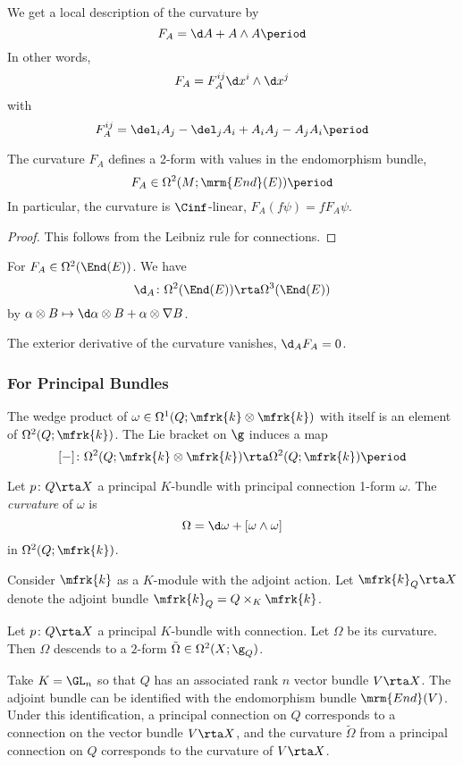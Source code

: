 We get a local description of the curvature by 
	\[
		F_A=\d A+A\wedge A\period 
	\]
	In other words, 
	\[
		F_A=F_A^{ij}\d x^i\wedge \d x^j
	\]
	with
	\[
		F^{ij}_A=\del_iA_j-\del_jA_i+A_iA_j-A_jA_i \period
	\]

\begin{claim}
The curvature $F_A$ defines a 2-form with values in the endomorphism bundle, \[F_A\in \Omega^2(M;\mrm{End}(E))\period\]
In particular, the curvature is $\Cinf$-linear, $F_A(f\psi)=fF_A\psi$. 
\end{claim}

\begin{proof}
This follows from the Leibniz rule for connections. 
\end{proof}

For $F_A\in\Omega^2(\End(E))$. 
We have 
\[
	\d_{A}\colon\Omega^2(\End(E))\rta\Omega^3(\End(E))
	\]
by $\alpha\otimes B\mapsto \d\alpha\otimes B+\alpha\otimes\nabla B$. 

\begin{thm}
The exterior derivative of the curvature vanishes, $\d_{A}F_A=0$.
\end{thm}

\subsubsection{For Principal Bundles}
\label{sssec:CW_principal}
The wedge product of $\omega\in \Omega^1(Q;\mfrk{k}\otimes\mfrk{k})$ with itself is an element of $\Omega^2(Q;\mfrk{k})$. 
The Lie bracket on $\g$ induces a map 
\[[-]\colon \Omega^2(Q;\mfrk{k}\otimes\mfrk{k})\rta\Omega^2(Q;\mfrk{k})\period\]

\begin{defn}
Let $p\colon Q\rta X$ a principal $K$-bundle with principal connection 1-form $\omega$. 
The \emph{curvature} of $\omega$ is 
\[\Omega=\d\omega+[\omega\wedge \omega]\]
in $\Omega^2(Q;\mfrk{k})$.
\end{defn}

Consider $\mfrk{k}$ as a $K$-module with the adjoint action. 
Let $\mfrk{k}_Q\rta X$ denote the adjoint bundle ${\mfrk{k}_Q=Q\times_K\mfrk{k}}$. 

\begin{lem}
Let $p\colon Q\rta X$ a principal $K$-bundle with connection. 
Let $\Omega$ be its curvature. 
Then $\Omega$ descends to a $2$-form $\tilde{\Omega}\in\Omega^2(X;\g_Q)$. 
\end{lem}

\begin{ex}
Take $K=\GL_n$ so that $Q$ has an associated rank $n$ vector bundle $V\rta X$. 
The adjoint bundle can be identified with the endomorphism bundle $\mrm{End}(V)$. 
Under this identification, 
a principal connection on $Q$ corresponds to a connection on the vector bundle $V\rta X$, and 
the curvature $\tilde{\Omega}$ from a principal connection on $Q$ corresponds to the curvature of $V\rta X$. 
\end{ex}

